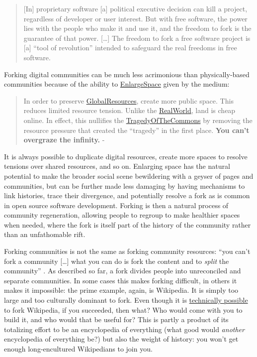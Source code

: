 \documentclass[notoc]{tufte-book}
\begin{document}
\begin{quote}
{[}In{]} proprietary software {[}a{]} political executive decision can
kill a project, regardless of developer or user interest. But with free
software, the power lies with the people who make it and use it, and the
freedom to fork is the guarantee of that power. {[}\ldots{]} The freedom
to fork a free software project is {[}a{]} ``tool of revolution''
intended to safeguard the real freedoms in free software. \citep{hancockOpenOfficeOrgDead2010} 
\end{quote}

Forking digital communities can be much less acrimonious than
physically-based communities because of the ability to
\href{http://meatballwiki.org/wiki/EnlargeSpace}{EnlargeSpace} given by
the medium:

\begin{quote}
In order to preserve
\href{http://meatballwiki.org/wiki/GlobalResource}{GlobalResources},
create more public space. This reduces limited resource tension. Unlike
the \href{http://meatballwiki.org/wiki/RealWorld}{RealWorld}, land is
cheap online. In effect, this nullifies the
\href{http://meatballwiki.org/wiki/GlobalResource}{TragedyOfTheCommons}
by removing the resource pressure that created the ``tragedy'' in the
first place. \textbf{You can't overgraze the infinity.} - \citep{MeatballWikiEnlargeSpace} 
\end{quote}

It is always possible to duplicate digital resources, create more spaces
to resolve tensions over shared resources, and so on. Enlarging space
has the natural potential to make the broader social scene bewildering
with a geyser of pages and communities, but can be further made less
damaging by having mechanisms to link histories, trace their divergence,
and potentially resolve a fork as is common in open source software
development. Forking is then a natural process of community
regeneration, allowing people to regroup to make healthier spaces when
needed, where the fork is itself part of the history of the community
rather than an unfathomable rift.

Forking communities is not the same as forking community resources:
``you can't fork a community {[}\ldots{]} what you can do is fork the
content and to \emph{split} the community'' \citep{MeatballWikiForkingOfOnlineCommunitiesa} . As described so far, a
fork divides people into unreconciled and separate communities. In some
cases this makes forking difficult, in others it makes it impossible:
the prime example, again, is Wikipedia. It is simply too large and too
culturally dominant to fork. Even though it is
\href{https://en.wikipedia.org/wiki/Wikipedia:FAQ/Forking\#Am_I_allowed_to_fork_Wikipedia?}{technically
possible} to fork Wikipedia, if you succeeded, then what? Who would come
with you to build it, and who would that be useful for? This is partly a
product of its totalizing effort to be an encyclopedia of everything
(what good would \emph{another} encyclopedia of everything be?) but also
the weight of history: you won't get enough long-encultured Wikipedians
to join you.
\end{document}
